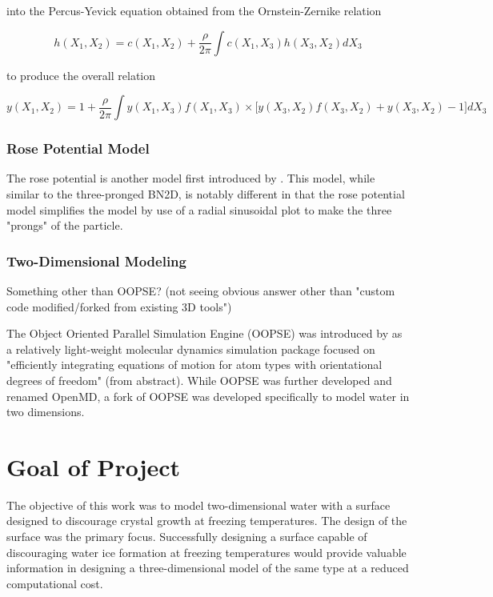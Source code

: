 into the Percus-Yevick equation obtained from the Ornstein-Zernike relation 

\begin{equation}
h(X_{1}, X_{2}) = c(X_{1}, X_{2}) + \frac{\rho}{2\pi}\int c(X_{1}, X_{3}) h(X_{3}, X_{2})dX_{3}
\end{equation}

to produce the overall relation

\begin{equation}
y(X_{1}, X_{2}) = 1 + \frac{\rho}{2\pi}\int y(X_{1}, X_{3})f(X_{1}, X_{3}) \times \Big[ y(X_{3}, X_{2})f(X_{3}, X_{2}) + y(X_{3}, X_{2}) - 1 \Big] dX_{3}
\end{equation}


\subsubsection{Rose Potential Model}

The rose potential is another model first introduced by \cite{RoseOG}.
This model, while similar to the three-pronged BN2D, is notably different in that the rose potential model simplifies the model by use of a radial sinusoidal plot to make the three "prongs" of the particle. 

\subsubsection{Two-Dimensional Modeling}

Something other than OOPSE? (not seeing obvious answer other than "custom code modified/forked from existing 3D tools")

The Object Oriented Parallel Simulation Engine (OOPSE) was introduced by \cite{OOPSE} as a relatively light-weight molecular dynamics simulation package focused on "efficiently integrating equations of motion for atom types with orientational degrees of freedom" (from abstract).
While OOPSE was further developed and renamed OpenMD, a fork of OOPSE was developed specifically to model water in two dimensions.

\section{Goal of Project}

The objective of this work was to model two-dimensional water with a surface designed to discourage crystal growth at freezing temperatures. 
The design of the surface was the primary focus. 
Successfully designing a surface capable of discouraging water ice formation at freezing temperatures would provide valuable information in designing a three-dimensional model of the same type at a reduced computational cost. 

